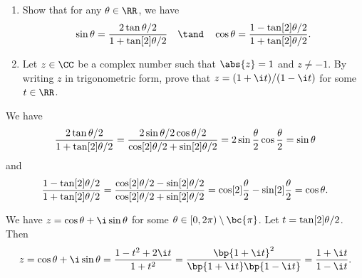\begin{problem}
    \begin{enumerate}
        \item Show that for any $\t \in \RR$, we have \[\sin \t = \frac{2\tan{\t/2}}{1 + \tan[2]{\t/2}} \quad \tand \quad \cos \t = \frac{1 - \tan[2]{\t/2}}{1 + \tan[2]{\t/2}}.\]
        \item Let $z \in \CC$ be a complex number such that $\abs{z} = 1$ and $z \neq -1$. By writing $z$ in trigonometric form, prove that $z = (1+\i t)/(1 - \i t)$ for some $t \in \RR$.
    \end{enumerate}
\end{problem}
\begin{solution}
    \begin{ppart}
        We have \[\frac{2\tan{\theta/2}}{1 + \tan[2]{\theta/2}} = \frac{2\sin{\theta/2} \cos{\theta/2}}{\cos[2]{\theta/2} + \sin[2]{\theta/2}} = 2\sin\frac{\theta}2\cos\frac{\theta}2 = \sin \theta\] and \[\frac{1 - \tan[2]{\theta/2}}{1 + \tan[2]{\theta/2}} = \frac{\cos[2]{\theta/2} - \sin[2]{\theta/2}}{\cos[2]{\theta/2} + \sin[2]{\theta/2}} = \cos[2]\frac{\theta}2 - \sin[2]\frac{\theta}2 = \cos \theta.\]
    \end{ppart}
    \begin{ppart}
        We have $z = \cos \t + \i \sin \t$ for some $\t \in [0, 2\pi) \setminus \bc{\pi}$. Let $t = \tan[2]{\theta/2}$. Then \[z = \cos \t + \i \sin \t = \frac{1 - t^2 + 2\i t}{1 + t^2} = \frac{\bp{1 + \i t}^2}{\bp{1 + \i t}\bp{1 - \i t}} = \frac{1 + \i t}{1 - \i t}.\]
    \end{ppart}
\end{solution}

